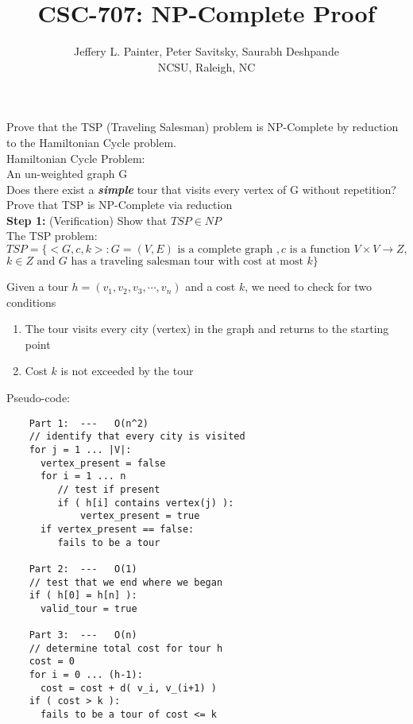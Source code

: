 \documentclass{article}
\begin{document}
\date{}

\title{\Large\bf CSC-707: NP-Complete Proof}

\author{Jeffery L. Painter, Peter Savitsky, Saurabh Deshpande\\
NCSU, Raleigh, NC}

\maketitle
\thispagestyle{empty}

  Prove that the TSP (Traveling Salesman) problem is NP-Complete 
  by reduction to the Hamiltonian Cycle problem. \\

  Hamiltonian Cycle Problem: \\
   An un-weighted graph G \\
   Does there exist a {\em{\bf simple}} tour 
                       that visits every vertex of G without repetition? \\
 
  Prove that TSP is NP-Complete via reduction \\

  {\bf Step 1:} (Verification) Show that $TSP \in NP$ \\

      \indent The TSP problem: 
      $TSP = \{ <G, c, k> : G = (V, E) \text{ is a complete graph }, c \text{ is a function } V \times V \rightarrow Z, $ \\
      \indent $k \in Z \text{ and } G \text{ has a traveling salesman tour with cost at most } k \}$

    Given a tour $h = (v_1, v_2, v_3, \cdots, v_n )$ and a cost $k$, we need to check for two conditions
    \begin{enumerate}
      \item The tour visits every city (vertex) in the graph and returns to the starting point
      \item Cost $k$ is not exceeded by the tour
    \end{enumerate}

    Pseudo-code: \\
    \begin{verbatim}
    Part 1:  ---   O(n^2)
    // identify that every city is visited
    for j = 1 ... |V|:
      vertex_present = false
      for i = 1 ... n
         // test if present
         if ( h[i] contains vertex(j) ):
             vertex_present = true
      if vertex_present == false:
         fails to be a tour

    Part 2:  ---   O(1)
    // test that we end where we began
    if ( h[0] = h[n] ):
      valid_tour = true

    Part 3:  ---   O(n)
    // determine total cost for tour h
    cost = 0
    for i = 0 ... (h-1):
      cost = cost + d( v_i, v_(i+1) )
    if ( cost > k ):
      fails to be a tour of cost <= k
    \end{verbatim}      
    
\end{document}
